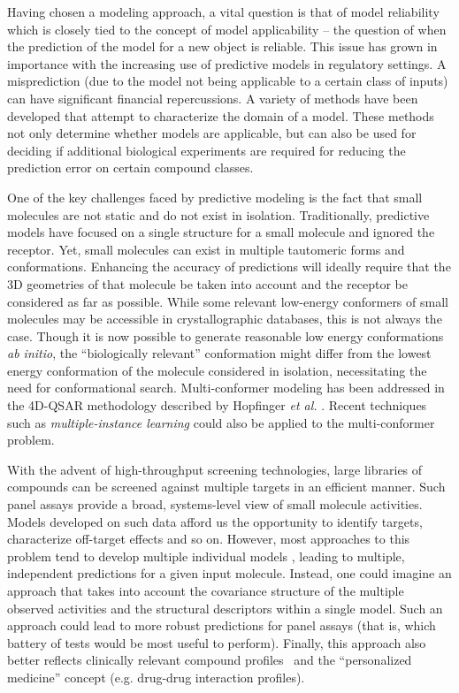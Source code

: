 \documentclass{sig-alternate}
\begin{document}
Having chosen a modeling approach, a vital question is that of model
reliability which is closely tied to the concept of model
applicability -- the question of when the prediction of the model for
a new object is reliable. This issue has grown in importance with the
increasing use of predictive models in regulatory settings. A
misprediction (due to the model not being applicable to a certain class
of inputs) can have significant financial repercussions. A variety of
methods have been developed that attempt to characterize the domain of
a model. These methods not only determine whether models are
applicable, but can also be used for deciding if additional biological
experiments are required for reducing the prediction error on certain
compound classes.

One of the key challenges faced by predictive modeling is the fact
that small molecules are not static and do not exist in isolation.
Traditionally, predictive models have focused on a single structure
for a small molecule and ignored the receptor. Yet, small molecules
can exist in multiple tautomeric forms and conformations.
Enhancing the accuracy of predictions
will ideally require that the 3D geometries of that molecule be taken
into account and the receptor be considered as far as possible.
While some relevant low-energy conformers of small
molecules may be accessible in crystallographic databases, this is
not always the case. Though it is now possible to generate reasonable
low energy conformations \emph{ab initio}, the
``biologically relevant'' conformation might differ from the lowest
energy conformation of the molecule considered in isolation,
necessitating the need for conformational search.  Multi-conformer
modeling has been addressed in the 4D-QSAR methodology described by
Hopfinger \textit{et al.}  \cite{Albuquerque:1998ys}.  Recent
techniques such as \emph{multiple-instance learning} could also be
applied to the multi-conformer problem.

With the advent of high-throughput screening technologies, large
libraries of compounds can be screened against multiple targets in an
efficient manner. Such panel assays provide a broad, systems-level
view of small molecule activities.  Models developed on such data
afford us the opportunity to identify targets, characterize off-target
effects and so on. However, most approaches to this problem tend to
develop multiple individual models \cite{Chen:2010zr}, leading to
multiple, independent predictions for a given input molecule.
Instead, one could imagine an approach that takes into account the
covariance structure of the multiple observed activities and the
structural descriptors within a single model. Such an approach could
lead to more robust predictions for panel assays (that is, which
battery of tests would be most useful to perform). Finally, this
approach also better reflects clinically relevant compound
profiles~\cite{kuhn2010} and the ``personalized medicine'' concept
(e.g. drug-drug interaction profiles).
\end{document}
